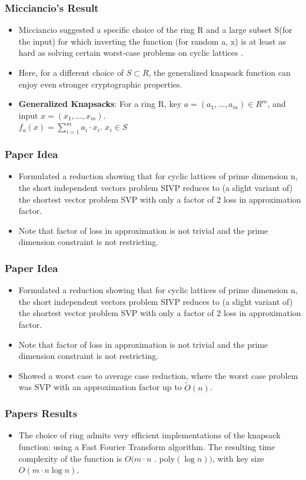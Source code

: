 \documentclass{beamer}
\begin{document}
\begin{frame}
	\frametitle{Micciancio's Result}
	\begin{itemize}
		\item Micciancio suggested a specific choice of the ring R and a large subset S(for the input) for which inverting the function (for random a, x) is at least as hard as solving certain worst-case problems on cyclic lattices \cite{Micciancio:2002:GCK:645413.652130}.
		\item Here, for a different choice of $S \subset R$, the generalized knapsack function can enjoy even stronger
		cryptographic properties.
		\item \textbf{Generalized Knapsacks}: For a ring R, key $a = (a_1 , . . . , a_m) \in R^m$, and input $x = (x_1 , . . . , x_m)$.
		\\
		$f_a(x) = \sum_{i=1}^{m}a_i·x_i$. $x_i \in  S$
	\end{itemize}
\end{frame}
\begin{frame}
\frametitle{Paper Idea}
\begin{itemize}
\item Formulated a reduction showing that for cyclic lattices of prime dimension n, the short independent vectors problem SIVP reduces to (a slight variant of) the shortest vector problem SVP with only a factor of 2 loss in approximation factor.
\item Note that factor of loss in approximation is not trivial and the prime dimension constraint is not restricting.
\end{itemize}
\end{frame}

\begin{frame}
	\frametitle{Paper Idea}
	\begin{itemize}
		\item Formulated a reduction showing that for cyclic lattices of prime dimension n, the short independent vectors problem SIVP reduces to (a slight variant of) the shortest vector problem SVP with only a factor of 2 loss in approximation factor.
		\item Note that factor of loss in approximation is not trivial and the prime dimension constraint is not restricting.
		\item Showed a worst case to average case reduction, where the worst case problem was SVP with an approximation factor up to $\tilde{O}(n)$.
	\end{itemize}
\end{frame}
\begin{frame}
\frametitle{Papers Results}
\begin{itemize}
\item The choice of ring admits very efficient implementations of the knapsack function: using a Fast Fourier Transform algorithm. The resulting time complexity of the function is $O(m · n $ . poly$(\log n))$, with key size $O(m · n \log n)$.
\end{itemize}

\end{frame}
\end{document}

